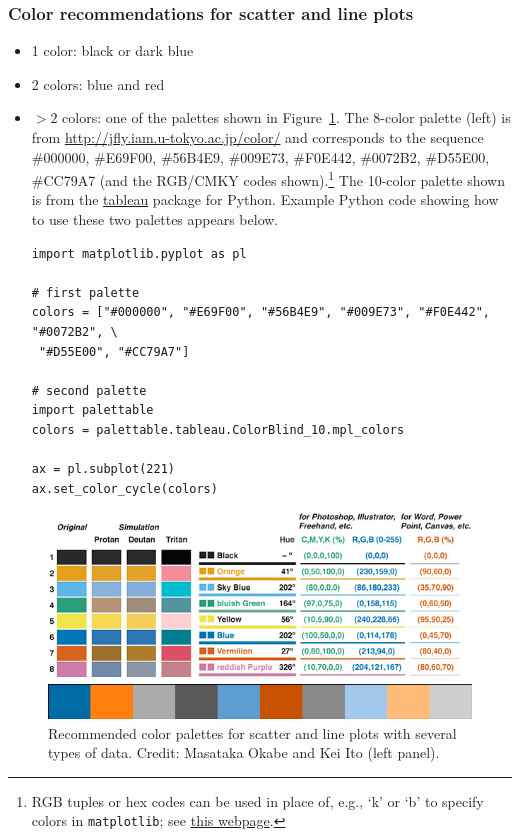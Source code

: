 \documentclass[letterpaper,11pt]{article}
\begin{document}
\subsubsection{Color recommendations for scatter and line plots}

\begin{itemize}
\item 1 color: black or dark blue
\item 2 colors: blue and red
\item $>2$ colors: one of the palettes shown in Figure~\ref{fig:palettes}. The 8-color palette (left) is from \url{http://jfly.iam.u-tokyo.ac.jp/color/} and corresponds to the sequence \#000000, \#E69F00, \#56B4E9, \#009E73, \#F0E442, \#0072B2, \#D55E00, \#CC79A7 (and the RGB/CMKY codes shown).\footnote{RGB tuples or hex codes can be used in place of, e.g., `k' or `b' to specify colors in {\tt matplotlib}; see \href{https://matplotlib.org/users/colors.html}{this webpage}.} The 10-color palette shown is from the \href {https://jiffyclub.github.io/palettable/tableau/}{tableau} package for Python. Example Python code showing how to use these two palettes appears below.
\begin{verbatim}
import matplotlib.pyplot as pl

# first palette
colors = ["#000000", "#E69F00", "#56B4E9", "#009E73", "#F0E442", "#0072B2", \
 "#D55E00", "#CC79A7"]

# second palette
import palettable
colors = palettable.tableau.ColorBlind_10.mpl_colors

ax = pl.subplot(221)
ax.set_color_cycle(colors)
\end{verbatim}
\end{itemize}

\begin{figure} 
 \includegraphics[scale=1.15]{figures/pallete}
 \hspace{1cm}
 \begin{minipage}[b]{0.5\textwidth}
   \includegraphics[scale=0.55]{figures/ColorBlind_10_discrete}\vspace{10mm}
 \end{minipage}
 \caption{Recommended color palettes for scatter and line plots with several types of data. Credit: Masataka Okabe and Kei Ito (left panel).}
 \label{fig:palettes}
\end{figure}
\end{document}
